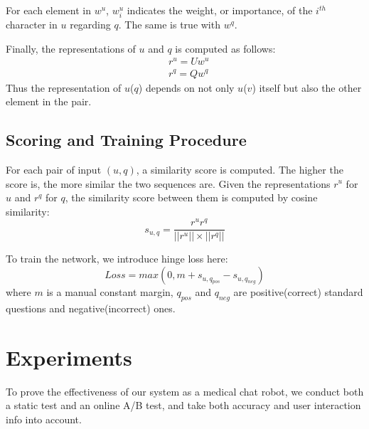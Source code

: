 \documentclass[a4paper,10pt]{article}
\begin{document}
\par For each element in $w^u$, $w^u_i$ indicates the weight, or importance, of the $i^{th}$ character in $u$ regarding $q$. The same is true with $w^q$.
\par Finally, the representations of $u$ and $q$ is computed as follows:
\begin{equation}
    \begin{aligned}
        &r^u=Uw^u \\
        &r^q=Q w^q
    \end{aligned}
\end{equation}
Thus the representation of $u$($q$) depends on not only $u$($v$) itself but also the other element in the pair.
\subsection{Scoring and Training Procedure}
\par For each pair of input $(u,q)$, a similarity score is computed. The higher the score is, the more similar the two sequences are. Given the representations $r^u$ for $u$ and $r^q$ for $q$, the similarity score between them is computed by cosine similarity:
\begin{equation}
    s_{u,q}=\frac{r^ur^q}{||r^u||\times||r^q||}
\end{equation}
\par To train the network, we introduce hinge loss here:
\begin{equation}
    Loss=max(0,m+s_{u,q_{pos}} - s_{u,q_{neg}})
\end{equation}
where $m$ is a manual constant margin, $q_{pos}$ and $q_{neg}$ are positive(correct) standard questions and negative(incorrect) ones.

\section{Experiments}
\par To prove the effectiveness of our system as a medical chat robot, we conduct both a static test and an online A/B test, and take both accuracy and user interaction info into account.
\end{document}
